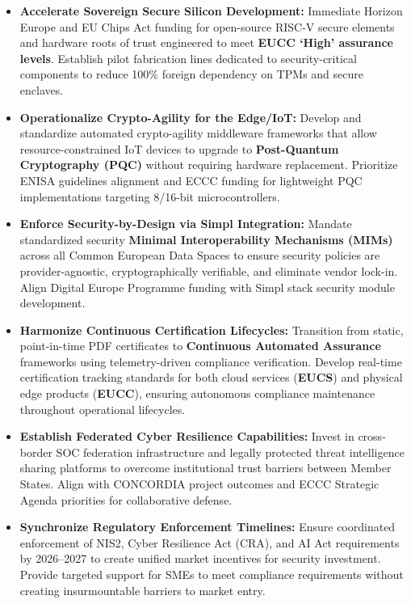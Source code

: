 \documentclass{ieeeaccess}
\begin{document}
\begin{itemize}
    \item \textbf{Accelerate Sovereign Secure Silicon Development:}
    Immediate Horizon Europe and EU Chips Act funding for open-source RISC-V secure elements
    and hardware roots of trust engineered to meet \textbf{EUCC `High' assurance levels}.
    Establish pilot fabrication lines dedicated to security-critical components to reduce
    100\% foreign dependency on TPMs and secure enclaves.

    \item \textbf{Operationalize Crypto-Agility for the Edge/IoT:}
    Develop and standardize automated crypto-agility middleware frameworks that allow
    resource-constrained IoT devices to upgrade to \textbf{Post-Quantum Cryptography (PQC)}
    without requiring hardware replacement. Prioritize ENISA guidelines alignment and ECCC
    funding for lightweight PQC implementations targeting 8/16-bit microcontrollers.

    \item \textbf{Enforce Security-by-Design via Simpl Integration:}
    Mandate standardized security \textbf{Minimal Interoperability Mechanisms (MIMs)} across
    all Common European Data Spaces to ensure security policies are provider-agnostic,
    cryptographically verifiable, and eliminate vendor lock-in. Align Digital Europe
    Programme funding with Simpl stack security module development.

    \item \textbf{Harmonize Continuous Certification Lifecycles:}
    Transition from static, point-in-time PDF certificates to \textbf{Continuous Automated
    Assurance} frameworks using telemetry-driven compliance verification. Develop real-time
    certification tracking standards for both cloud services (\textbf{EUCS}) and physical
    edge products (\textbf{EUCC}), ensuring autonomous compliance maintenance throughout
    operational lifecycles.

    \item \textbf{Establish Federated Cyber Resilience Capabilities:}
    Invest in cross-border SOC federation infrastructure and legally protected threat
    intelligence sharing platforms to overcome institutional trust barriers between Member
    States. Align with CONCORDIA project outcomes and ECCC Strategic Agenda priorities for
    collaborative defense.

    \item \textbf{Synchronize Regulatory Enforcement Timelines:}
    Ensure coordinated enforcement of NIS2, Cyber Resilience Act (CRA), and AI Act
    requirements by 2026--2027 to create unified market incentives for security investment.
    Provide targeted support for SMEs to meet compliance requirements without creating
    insurmountable barriers to market entry.
\end{itemize}
\end{document}
